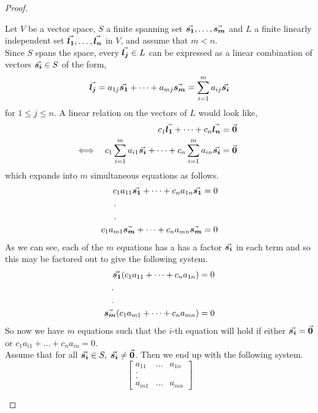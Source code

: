 \documentclass[MathsNotesBase.tex]{subfiles}
\begin{document}
{\begin{proof}
\begin{enumerate}[label=(\roman*)]
{				Let $V$ be a vector space, $S$ a finite spanning set ${ \vec{\bm{s_1}}, \dots, \vec{\bm{s_m}} }$ and $L$ a finite linearly independent set ${ \vec{\bm{l_1}},\dots, \vec{\bm{l_n}} }$ in $V$, and assume that ${ m < n }$.\\
				Since $S$ spans the space, every ${ \vec{\bm{l_j}} \in L }$ can be expressed as a linear combination of vectors ${ \vec{\bm{s_i}} \in S }$ of the form,
				\[ \vec{\bm{l_j}} = a_{1j}\vec{\bm{s_1}} + \dots + a_{mj}\vec{\bm{s_m}} = \sum_{i=1}^m a_{ij}\vec{\bm{s_i}} \]
				for ${ 1 \leq j \leq n }$. A linear relation on the vectors of $L$ would look like,
				\begin{align*}
				&& c_1\vec{\bm{l_1}} + \dots + c_n\vec{\bm{l_n}} &= \vec{\bm{0}} \\
				&\iff & c_1\sum_{i=1}^m a_{i1}\vec{\bm{s_i}} + \dots + c_n\sum_{i=1}^m a_{in}\vec{\bm{s_i}}  &= \vec{\bm{0}} &\text{\scriptsize{}}
				\end{align*}
				which expands into $m$ simultaneous equations as follows.
				\begin{align*}
					c_1a_{11}\V{s_1} + \dots + c_na_{1n}\V{s_1}  &= 0 \\
					. \hspace{100pt} & \\
					. \hspace{100pt} & \\
					c_1a_{m1}\V{s_m} + \dots + c_na_{mn}\V{s_m}  &= 0
				\end{align*}
				As we can see, each of the $m$ equations has a has a factor $\vec{\bm{s_i}}$ in each term and so this may be factored out to give the following system.
				\begin{align*}
					\V{s_1}(c_1a_{11} + \dots + c_na_{1n})  &= 0 \\
					. \hspace{100pt} & \\
					. \hspace{100pt} & \\
					\V{s_m}(c_1a_{m1} + \dots + c_na_{mn})  &= 0
				\end{align*}
				So now we have $m$ equations such that the $i$-th equation will hold if either ${ \vec{\bm{s_i}} = \vec{\bm{0}} }$ or ${ c_1a_{i1} + \dots + c_na_{in} = 0 }$.\\
				Assume that for all ${ \vec{\bm{s_i}} \in S,\; \vec{\bm{s_i}} \neq \vec{\bm{0}} }$. Then we end up with the following system.
				\[
					\begin{bmatrix}
					a_{11} & \dots & a_{1n} \\
					. && \\
					. && \\
					a_{m1} & \dots & a_{mn}
					\end{bmatrix}
\]}
\end{enumerate}
\end{proof}}
\end{document}
